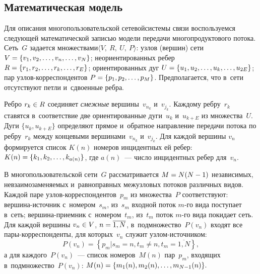 \begin{multicols}{2}
\vspace*{-3pt}

\section{Математическая модель}

Для описания многопользовательской сетевой\linebreak системы связи  воспользуемся 
следующей математической записью модели передачи многопродуктового потока.
Сеть~$G$ задается множествами\linebreak  $\langle V,\ R, \ U,\ P \rangle$:
узлов (вершин) сети  $V \hm= \{ v_1, v_2, \ldots, v_n, \ldots, v_N \}$;
неориентированных ребер $R \hm= \{ r_1, r_2, \ldots, r_k, \ldots, r_E \}$;
ориентированных дуг  $U \hm= \{ u_1, u_2, \ldots, u_k, \ldots, u_{2E}\}$;
пар уз\-лов-кор\-рес\-пон\-ден\-тов $P \hm= \{ p_1, p_2, \ldots, p_M\}$.
Предполагается, что в~сети отсутствуют петли и~сдвоенные ребра.

Ребро $r_k\hm \in R$ соединяет \textit{смежные} вершины~$v_{n_k}$ и~$v_{j_k}$.
Каждому ребру~$r_k$ ставятся в~соответствие две ориентированные дуги~$u_k$  
и~$u_{k+E}$ из множества~$U$.
Дуги $\{u_k, u_{k+E}\}$ определяют прямое и~обратное направление передачи потока 
по  ребру~$r_k$ между концевыми вершинами~$v_{n_k}$ и~$v_{j_k}$. Для каждой 
вершины $v_n$ формируется список $K(n)$ номеров инцидентных ей ребер: $K(n)\hm = 
\{k_1, k_2, \ldots, k_{a(n)}\}$, где $a(n)$~--- число инцидентных ребер для~$v_n$.

В многопользовательской сети~$G$ рассматривается $M \hm= N (N\hm-1)$ независимых, 
невзаимозаменяемых и~равноправных межузловых потоков различных видов.
Каждой паре уз\-лов-кор\-рес\-пон\-ден\-тов~$p_m$ из множества~$P$ соответствуют:
вер\-ши\-на-ис\-точ\-ник с~номером~$s_m$,  из~$s_m$  входной поток $m$-го вида поступает в~сеть;
вер\-ши\-на-при\-ем\-ник с~номером~${t_m}$, из~${t_m}$ поток $m$-го вида покидает сеть.
Для каждой вершины $v_n \hm\in V$, $n \hm= \overline{1, N}$, в~подмножество~$P(v_n)$ входят 
все па\-ры-кор\-рес\-пон\-ден\-ты, для которых~$v_n$ служит уз\-лом-ис\-точ\-ни\-ком:
$$
P(v_n) = \left\{ p_m | s_m= n, t_m \not = n, t_m = \overline{1, N} \right\},
$$
а для каждого~$P(v_n)$~--- список номеров~$M(n)$ пар~$p_m$, входящих в~подмножество~$P(v_n)$:
$M(n) \hm= \{m_1(n), m_2(n), \ldots, m_{N-1}(n)\}.$


\end{multicols}
